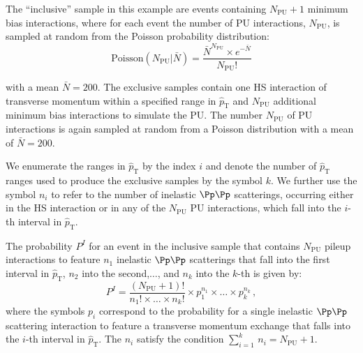 \documentclass[twocolumn,epjc3]{svjour3}
\newcommand{\pThat}{\ensuremath{\hat{p}_{\textrm{T}}}\xspace}
\newcommand{\pileup}{\ensuremath{\textrm{PU}}\xspace}
\newcommand{\Poisson}{\ensuremath{\textrm{Poisson}}\xspace}
\newcommand{\Nbar}{\ensuremath{\bar{N}}\xspace}
\begin{document}
The ``inclusive'' sample in this example are events containing $N_{\pileup} + 1$ minimum bias interactions,
where for each event the number of PU interactions, $N_{\pileup}$, is sampled at random from the Poisson probability distribution:
\begin{equation}
\Poisson(N_{\pileup} \vert \Nbar) = \frac{\Nbar^{N_{\pileup}} \times e^{-\Nbar}}{N_{\pileup}!}
\label{eq:Poisson}
\end{equation}

with a mean $\Nbar = 200$.
The exclusive samples contain one HS interaction of transverse momentum within a specified range in $\pThat$ and $N_{\pileup}$ additional minimum bias interactions to simulate the PU.
The number $N_{\pileup}$ of PU interactions is again sampled at random from a Poisson distribution with a mean of $\Nbar = 200$.

We enumerate the ranges in $\pThat$ by the index $i$ and denote the number of $\pThat$ ranges used to produce the exclusive samples by the symbol $k$.
We further use the symbol $n_{i}$ to refer to the number of inelastic $\Pp\Pp$ scatterings,
occurring either in the HS interaction or in any of the $N_{\pileup}$ PU interactions,
which fall into the $i$-th interval in $\pThat$.

The probability $P^{I}$ for an event in the inclusive sample that contains $N_{\pileup}$ pileup interactions
to feature $n_{1}$ inelastic $\Pp\Pp$ scatterings that fall into the first interval in $\pThat$, $n_{2}$ into the second,$\dots$, and $n_{k}$ into the $k$-th 
is given by:
\begin{equation}
P^{I} = \frac{(N_{\pileup} + 1)!}{n_{1}! \times \dots \times n_{k}!} \times p_{1}^{n_{1}} \times \dots \times p_{k}^{n_{k}} \, ,
\label{eq:P_inclusive}
\end{equation}
where the symbols $p_{i}$ correspond to the probability for a single inelastic $\Pp\Pp$ scattering interaction to feature a transverse momentum exchange that falls into the $i$-th interval in $\pThat$.
The $n_{i}$ satisfy the condition $\sum_{i=1}^{k} \, n_{i} = N_{\pileup} + 1$.
\end{document}
